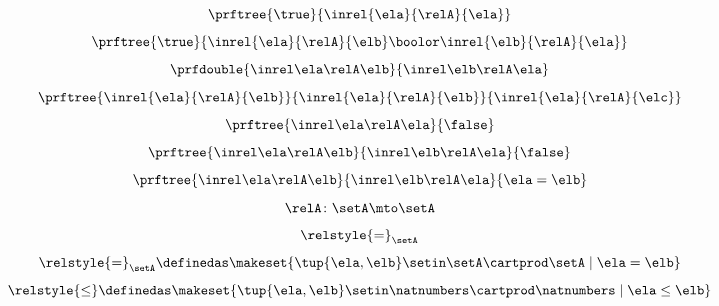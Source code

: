 \begin{forslides}
    \begin{equation}\label{eq:slides_session2_139}
        \prftree{\true}{\inrel{\ela}{\relA}{\ela}}
    \end{equation}
    \begin{equation}\label{eq:slides_session2_140}
        \prftree{\true}{\inrel{\ela}{\relA}{\elb} \boolor \inrel{\elb}{\relA}{\ela}}
    \end{equation}
    \begin{equation}\label{eq:slides_session2_141}
        \prfdouble{
            \inrel \ela \relA \elb
        }{
            \inrel \elb \relA \ela
        }
    \end{equation}
    \begin{equation}\label{eq:slides_session2_142}
        \prftree{\inrel{\ela}{\relA}{\elb}}{\inrel{\ela}{\relA}{\elb}}{\inrel{\ela}{\relA}{\elc}}
    \end{equation}
    \begin{equation}\label{eq:slides_session2_143}
        \prftree{
            \inrel \ela \relA \ela
        }{
            \false
        }
    \end{equation}
    \begin{equation}\label{eq:slides_session2_144}
        \prftree{
            \inrel \ela \relA \elb
        }{
            \inrel \elb \relA \ela
        }{
            \false
        }
    \end{equation}
    \begin{equation}\label{eq:slides_session2_145}
        \prftree{
            \inrel \ela \relA \elb
        }{
            \inrel \elb \relA \ela
        }{
            \ela = \elb
        }
    \end{equation}
    \begin{equation}\label{eq:slides_session2_146}
        \relA\colon \setA \mto \setA
    \end{equation}
    \begin{equation}\label{eq:slides_session2_147}
        \relstyle{=}_\setA
    \end{equation}
    \begin{equation}\label{eq:slides_session2_148}
        \relstyle{=}_\setA \definedas \makeset{\tup{\ela,\elb}\setin \setA\cartprod \setA \mid \ela=\elb}
    \end{equation}
    \begin{equation}\label{eq:slides_session2_149}
        \relstyle{\leq} \definedas  \makeset{\tup{\ela,\elb}\setin \natnumbers\cartprod \natnumbers\mid \ela \leq \elb}

\end{equation}
\end{forslides}
